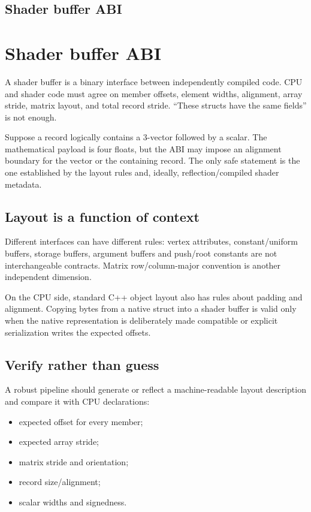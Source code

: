 \hypertarget{appendix-749048795dbb}{}
\section*{Shader buffer ABI}
\chapter{Shader buffer ABI}\label{appendix-749048795dbb-shader-buffer-abi}

A shader buffer is a binary interface between independently compiled code. CPU and shader code must agree on member offsets, element widths, alignment, array stride, matrix layout, and total record stride. ``These structs have the same fields'' is not enough.

Suppose a record logically contains a 3-vector followed by a scalar. The mathematical payload is four floats, but the ABI may impose an alignment boundary for the vector or the containing record. The only safe statement is the one established by the layout rules and, ideally, reflection/compiled shader metadata.

\section{Layout is a function of context}\label{appendix-749048795dbb-layout-is-a-function-of-context}

Different interfaces can have different rules: vertex attributes, constant/uniform buffers, storage buffers, argument buffers and push/root constants are not interchangeable contracts. Matrix row/column-major convention is another independent dimension.

On the CPU side, standard C++ object layout also has rules about padding and alignment. Copying bytes from a native struct into a shader buffer is valid only when the native representation is deliberately made compatible or explicit serialization writes the expected offsets.

\section{Verify rather than guess}\label{appendix-749048795dbb-verify-rather-than-guess}

A robust pipeline should generate or reflect a machine-readable layout description and compare it with CPU declarations:

\begin{itemize}
\tightlist
\item
  expected offset for every member;
\item
  expected array stride;
\item
  matrix stride and orientation;
\item
  record size/alignment;
\item
  scalar widths and signedness.
\end{itemize}

